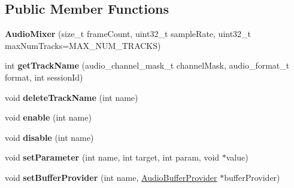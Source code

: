 \subsection*{Public Member Functions}
\begin{DoxyCompactItemize}
\item 
\mbox{\label{classcocos2d_1_1experimental_1_1AudioMixer_a63e35a29bf6e19b262c622c655aa114f}} 
{\bfseries Audio\+Mixer} (size\+\_\+t frame\+Count, uint32\+\_\+t sample\+Rate, uint32\+\_\+t max\+Num\+Tracks=M\+A\+X\+\_\+\+N\+U\+M\+\_\+\+T\+R\+A\+C\+KS)
\item 
\mbox{\label{classcocos2d_1_1experimental_1_1AudioMixer_ac364aeeaa14ba494e5b257332ff4ef63}} 
int {\bfseries get\+Track\+Name} (audio\+\_\+channel\+\_\+mask\+\_\+t channel\+Mask, audio\+\_\+format\+\_\+t format, int session\+Id)
\item 
\mbox{\label{classcocos2d_1_1experimental_1_1AudioMixer_a2d7d78fbee19e7430c00f08eba19251b}} 
void {\bfseries delete\+Track\+Name} (int name)
\item 
\mbox{\label{classcocos2d_1_1experimental_1_1AudioMixer_a2bc1a3464f19a01dc2557dfedd2a6607}} 
void {\bfseries enable} (int name)
\item 
\mbox{\label{classcocos2d_1_1experimental_1_1AudioMixer_a916ecb0f49474c9ab83c9a1185025e48}} 
void {\bfseries disable} (int name)
\item 
\mbox{\label{classcocos2d_1_1experimental_1_1AudioMixer_a952176a2d624378f2f5b5b6d46ef0089}} 
void {\bfseries set\+Parameter} (int name, int target, int param, void $\ast$value)
\item 
\mbox{\label{classcocos2d_1_1experimental_1_1AudioMixer_a89e2c733426ac9d4d4cbf4d213339f7d}} 
void {\bfseries set\+Buffer\+Provider} (int name, \hyperlink{classcocos2d_1_1experimental_1_1AudioBufferProvider}{Audio\+Buffer\+Provider} $\ast$buffer\+Provider)
\item 
\mbox{\label{classcocos2d_1_1experimental_1_1AudioMixer_a812f0c0816c9ba236d694ab52f48e592}} 

\end{DoxyCompactItemize}
